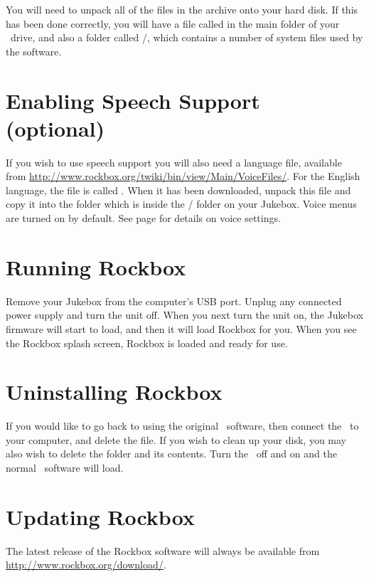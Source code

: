 You will need to unpack all of the files in the archive onto your hard disk. If 
this has been done correctly, you will have a file called 
\fname{\firmwarefilename} in the main folder of your \playername\ drive, and
also a folder called /, which contains a number of system files
used by the software.

\section{Enabling Speech Support (optional)}\label{sec:enabling_speech_support}
If you wish to use speech support you will also need a language file, available
from \url{http://www.rockbox.org/twiki/bin/view/Main/VoiceFiles/}.  For the
English language, the file is called . When it has been
downloaded, unpack this file and copy it into the  folder which is
inside the / folder on your Jukebox. Voice menus are turned on
by default. See page \pageref{ref:Voiceconfiguration} for details on voice
settings.

\section{Running Rockbox}
Remove your Jukebox from the computer's USB port. Unplug any connected power
supply and turn the unit off. When you next turn the unit on, the Jukebox
firmware will start to load, and then it will load Rockbox for you. When you see
the Rockbox splash screen, Rockbox is loaded and ready for use.

\section{Uninstalling Rockbox}
If you would like to go back to using the original \playername\ software, then
connect the \playername\ to your computer, and delete the
\fname{\firmwarefilename} file. If you wish to clean up your disk, you may also
wish to delete the  folder and its contents. Turn the
\playername\ off and on and the normal \playername\ software will load.

\section{Updating Rockbox}
The latest release of the Rockbox software will always be available from
\url{http://www.rockbox.org/download/}.
